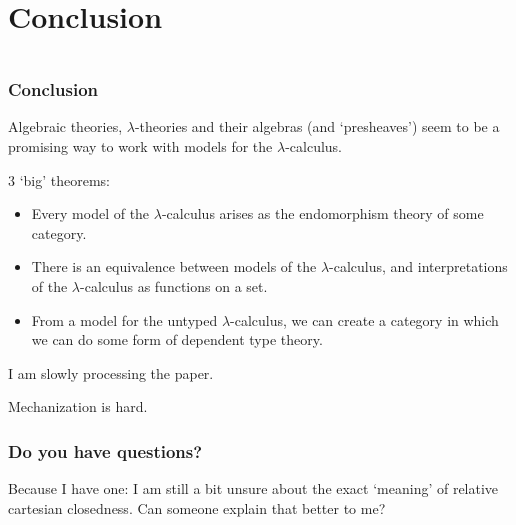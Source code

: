 \documentclass[aspectratio=169]{fancyslides} %
\begin{document}
  \section{Conclusion}

  \begin{frame}[fragile]
    \begin{columns}
      \begin{column}{.5\textwidth}
        \tableofcontents[currentsection]
      \end{column}
      \begin{column}{.5\textwidth}
      \end{column}
    \end{columns}
  \end{frame}

  \begin{frame}
    \frametitle{Conclusion}

    Algebraic theories, $ \lambda $-theories and their algebras (and `presheaves') seem to be a promising way to work with models for the $ \lambda $-calculus.

    \pause

    3 `big' theorems:
    \begin{itemize}
      \item Every model of the $ \lambda $-calculus arises as the endomorphism theory of some category.
      \item There is an equivalence between models of the $ \lambda $-calculus, and interpretations of the $ \lambda $-calculus as functions on a set.
      \item From a model for the untyped $ \lambda $-calculus, we can create a category in which we can do some form of dependent type theory.
    \end{itemize}

    \pause

    I am slowly processing the paper.

    \pause

    Mechanization is hard.

  \end{frame}

  \begin{frame}
    \frametitle{Do you have questions?}

    \pause

    Because I have one: I am still a bit unsure about the exact `meaning' of relative cartesian closedness. Can someone explain that better to me?

  \end{frame}
\end{document}
